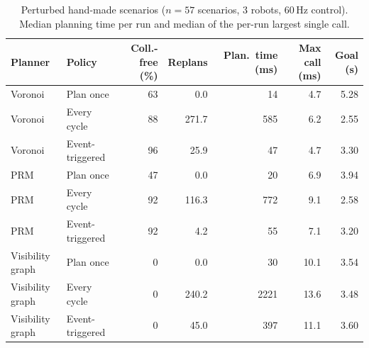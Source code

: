 \begin{table}[t]
\centering
\footnotesize
\caption{Perturbed hand-made scenarios ($n=57$ scenarios, 3 robots, 60\,Hz control). Median planning time per run and median of the per-run largest single call.}
\label{tab:perturbed}
\begin{tabular}{llrrrrr}
\hline
Planner & Policy & Coll.-free (\%) & Replans & Plan.\ time (ms) & Max call (ms) & Goal (s) \\
\hline
Voronoi & Plan once & 63 & 0.0 & 14 & 4.7 & 5.28 \\
Voronoi & Every cycle & 88 & 271.7 & 585 & 6.2 & 2.55 \\
Voronoi & Event-triggered & 96 & 25.9 & 47 & 4.7 & 3.30 \\
PRM & Plan once & 47 & 0.0 & 20 & 6.9 & 3.94 \\
PRM & Every cycle & 92 & 116.3 & 772 & 9.1 & 2.58 \\
PRM & Event-triggered & 92 & 4.2 & 55 & 7.1 & 3.20 \\
Visibility graph & Plan once & 0 & 0.0 & 30 & 10.1 & 3.54 \\
Visibility graph & Every cycle & 0 & 240.2 & 2221 & 13.6 & 3.48 \\
Visibility graph & Event-triggered & 0 & 45.0 & 397 & 11.1 & 3.60 \\
\hline
\end{tabular}
\end{table}
